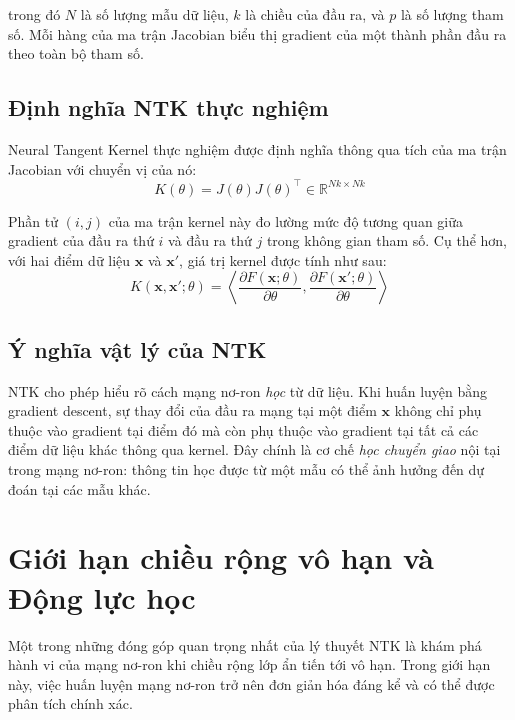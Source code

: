 trong đó $N$ là số lượng mẫu dữ liệu, $k$ là chiều của đầu ra, và $p$ là số lượng tham số. Mỗi hàng của ma trận Jacobian biểu thị gradient của một thành phần đầu ra theo toàn bộ tham số.

\subsection{Định nghĩa NTK thực nghiệm}

Neural Tangent Kernel thực nghiệm được định nghĩa thông qua tích của ma trận Jacobian với chuyển vị của nó:
\begin{equation}
    K(\theta) = J(\theta) J(\theta)^\top \in \mathbb{R}^{Nk \times Nk}
\end{equation}

Phần tử $(i,j)$ của ma trận kernel này đo lường mức độ tương quan giữa gradient của đầu ra thứ $i$ và đầu ra thứ $j$ trong không gian tham số. Cụ thể hơn, với hai điểm dữ liệu $\mathbf{x}$ và $\mathbf{x}'$, giá trị kernel được tính như sau:
\begin{equation}
    K(\mathbf{x}, \mathbf{x}'; \theta) = \left\langle \frac{\partial F(\mathbf{x}; \theta)}{\partial \theta}, \frac{\partial F(\mathbf{x}'; \theta)}{\partial \theta} \right\rangle
\end{equation}

\subsection{Ý nghĩa vật lý của NTK}

NTK cho phép hiểu rõ cách mạng nơ-ron \textit{học} từ dữ liệu. Khi huấn luyện bằng gradient descent, sự thay đổi của đầu ra mạng tại một điểm $\mathbf{x}$ không chỉ phụ thuộc vào gradient tại điểm đó mà còn phụ thuộc vào gradient tại tất cả các điểm dữ liệu khác thông qua kernel. Đây chính là cơ chế \textit{học chuyển giao} nội tại trong mạng nơ-ron: thông tin học được từ một mẫu có thể ảnh hưởng đến dự đoán tại các mẫu khác.

\section{Giới hạn chiều rộng vô hạn và Động lực học}

Một trong những đóng góp quan trọng nhất của lý thuyết NTK là khám phá hành vi của mạng nơ-ron khi chiều rộng lớp ẩn tiến tới vô hạn. Trong giới hạn này, việc huấn luyện mạng nơ-ron trở nên đơn giản hóa đáng kể và có thể được phân tích chính xác.

